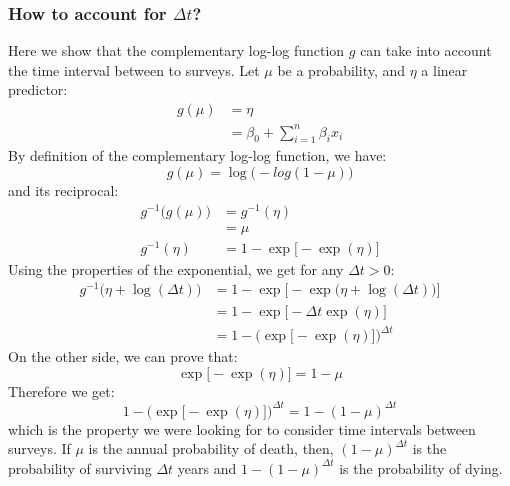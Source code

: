 \begin{refsection}
\subsubsection{How to account for $ \Delta t $?}
Here we show that the complementary log-log function $ g $ can take into account the time interval between to surveys. Let $ \mu $ be a probability, and $ \eta $ a linear predictor:
\begin{align*}
	g(\mu) &= \eta \\
		&= \beta_0 + \sum_{i = 1}^{n} \beta_i x_i
\end{align*}
By definition of the complementary log-log function, we have:
\[
	g(\mu) = \log \big( -log(1 - \mu) \big)
\]
and its reciprocal:
\begin{align*}
	g^{-1} \big( g(\mu) \big) &= g^{-1}(\eta) \\
		&= \mu \\
	g^{-1}(\eta) &= 1 - \exp \big[ -\exp(\eta) \big]
\end{align*}
Using the properties of the exponential, we get for any $ \Delta t > 0 $:
\begin{align*}
	g^{-1} \big( \eta + \log(\Delta t) \big) &= 1 - \exp \Big[ -\exp \big(\eta + \log(\Delta t)\big) \Big] \\
		&= 1 - \exp \big[ - \Delta t \exp (\eta) \big] \\
		&= 1 - \Big( \exp \big[ -\exp (\eta) \big] \Big)^{\Delta t}
\end{align*}
On the other side, we can prove that:
\[
	\exp \big[ -\exp (\eta) \big] = 1 - \mu
\]
Therefore we get:
\begin{equation}
	1 - \Big( \exp \big[ -\exp (\eta) \big] \Big)^{\Delta t} = 1 - (1 - \mu)^{\Delta t}
\end{equation}
which is the property we were looking for to consider time intervals between surveys. If $ \mu $ is the annual probability of death, then, $ (1 - \mu)^{\Delta t} $ is the probability of surviving $ \Delta t $ years and $ 1 - (1 - \mu)^{\Delta t} $ is the probability of dying.


\end{refsection}
